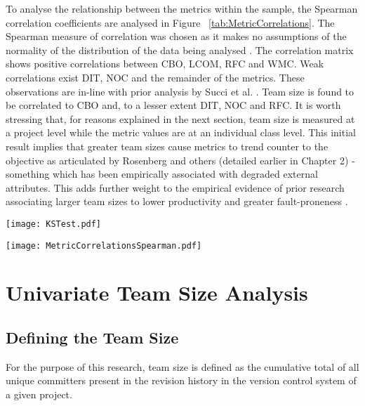 To analyse the relationship between the metrics within the sample, the Spearman correlation coefficients are analysed in Figure ~\ref{tab:MetricCorrelations}. The Spearman measure of correlation was chosen as it makes no assumptions of the normality of the distribution of the data being analysed \citep{spearman1904proof}. The correlation matrix shows positive correlations between CBO, LCOM, RFC and WMC. Weak correlations exist DIT, NOC and the remainder of the metrics. These observations are in-line with prior analysis by Succi et al. \citep{succi2005empirical}. Team size is found to be correlated to CBO and, to a lesser extent DIT, NOC and RFC. It is worth stressing that, for reasons explained in the next section, team size is measured at a project level while the metric values are at an individual class level. This initial result implies that greater team sizes cause metrics to trend counter to the objective as articulated by Rosenberg and others (detailed earlier in Chapter 2) - something which has been empirically associated with degraded external attributes. This adds further weight to the empirical evidence of prior research associating larger team sizes to lower productivity \citep{pendharkar2009relationship} and greater fault-proneness \citep{nagappan2008influence, caglayan2015merits}.

\begin{table}
\centering 
{}
\begin{tabular}
 \centering 
 \texttt{[image: KSTest.pdf]}
 \label{tab:KSTest}
\end{tabular}
\end{table}

\begin{table}
\centering 
{}
\begin{tabular}
 \centering 
 \texttt{[image: MetricCorrelationsSpearman.pdf]}
 \label{tab:MetricCorrelations}
\end{tabular}
\end{table}


\section{Univariate Team Size Analysis} %
\subsection{Defining the Team Size}
For the purpose of this research, team size is defined as the cumulative total of all unique committers present in the revision history in the version control system of a given project. 

